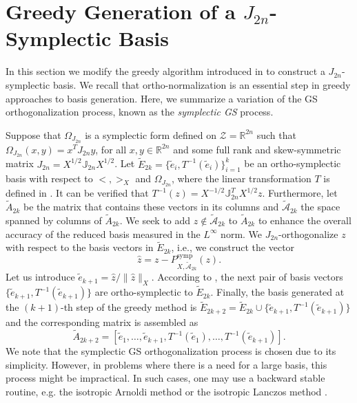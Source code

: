 \section{Greedy Generation of a $J_{2n}$-Symplectic Basis} \label{sec:normmor.2}
In this section we modify the greedy algorithm introduced in  to construct a $J_{2n}$-symplectic basis. We recall that ortho-normalization is an essential step in greedy approaches to basis generation. Here, we summarize a variation of the GS orthogonalization process, known as the \emph{symplectic GS} process.

Suppose that $\Omega_{J_{2n}}$ is a symplectic form defined on $\mathcal Z =\mathbb R^{2n}$ such that $\Omega_{J_{2n}}(x,y) = x^T J_{2n} y$, for all $x,y\in \mathbb R^{2n}$ and some full rank and skew-symmetric matrix $J_{2n} = X^{1/2} \mathbb J_{2n} X^{1/2}$. Let $\tilde E_{2k} = \{ \tilde e_i , T^{-1}(\tilde e_i) \}_{i=1}^k$ be an ortho-symplectic basis with respect to $<,>_X$ and $\Omega_{J_{2n}}$, where the linear transformation $T$ is defined in . It can be verified that $T^{-1}(z) = X^{-1/2}\mathbb J^T_{2n}X^{1/2}z$. Furthermore, let $\tilde A_{2k}$ be the matrix that contains these vectors in its columns and $\tilde {\mathcal A}_{2k}$ the space spanned by columns of $\tilde A_{2k}$. We seek to add $z\not \in \tilde{\mathcal A}_{2k}$ to $\tilde A_{2k}$ to enhance the overall accuracy of the reduced basis measured in the $L^{\infty}$ norm. We $J_{2n}$-orthogonalize $z$ with respect to the basis vectors in $\tilde E_{2k}$, i.e., we construct the vector 
\begin{equation} \label{eq:normmor.9}
	\hat z = z - P^{\text{symp}}_{X,\tilde{\mathcal A}_{2k}}(z).
\end{equation}
Let us introduce $\tilde e_{k+1} = \hat z / \| \hat z \|_X$. According to , the next pair of basis vectors $\{ \tilde e_{k+1} , T^{-1}( \tilde e_{k+1})\}$ are ortho-symplectic to $\tilde E_{2k}$. Finally, the basis generated at the $(k+1)$-th step of the greedy method is $\tilde E_{2k+2} = \tilde E_{2k}\cup\{ \tilde e_{k+1} , T^{-1}(\tilde e_{k+1})\}$ and the corresponding matrix is assembled as
\begin{equation} \label{eq:normmor.11}
	\tilde A_{2k+2} = [\tilde e_1,\dots,\tilde e_{k+1},T^{-1}(\tilde e_1),\dots,T^{-1}(\tilde e_{k+1})].
\end{equation}
We note that the symplectic GS orthogonalization process is chosen due to its simplicity. However, in problems where there is a need for a large basis, this process might be impractical. In such cases, one may use a backward stable routine, e.g. the isotropic Arnoldi method or the isotropic Lanczos method \cite{doi:10.1137/S1064827500366434}.

